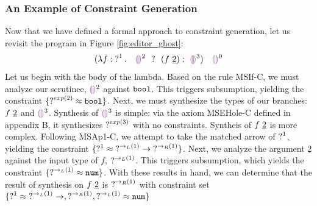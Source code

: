\subsubsection{An Example of Constraint Generation}
Now that we have defined a formal approach to constraint generation, let us revisit the program in Figure \ref{fig:editor_ghost}:
$$\ECAp{(\ECLam{f}{\TUnknown^1}{~~\ECIf{\EEHole^2~}{~(\ECAp{f}{\underline{2}})}{~\EEHole^3}})}{~~\EEHole^0}$$
Let us begin with the body of the lambda. Based on the rule MSIf-C, we must analyze our scrutinee, $\EEHole^2$ against $\mathtt{bool}$. This triggers subsumption, yielding the constraint $\{ \operatorname{?}^{exp(2)} \approx \mathtt{bool} \}$. Next, we must synthesize the types of our branches: $f ~\underline{2}$ and $\EEHole^3$. 
Synthesis of $\EEHole^3$ is simple: via the axiom MSEHole-C defined in appendix B, it synthesizes $\operatorname{?}^{exp(3)}$ with no constraints.
Syntheis of $f ~\underline{2}$ is more complex. Following MSAp1-C, we attempt to take the matched arrow of $\operatorname{?}^1$, yielding the constraint $\{ \operatorname{?}^1 \approx \operatorname{?}^{\rightarrow_L(1)} \rightarrow \operatorname{?}^{\rightarrow_R(1)} \}$. Next, we analyze the argument $\underline{2}$ against the input type of $f$, $\operatorname{?}^{\rightarrow_L(1)}$. This triggers subsumption, which yields the constraint $\{ \operatorname{?}^{\rightarrow_L(1)} \approx \mathtt{num} \}$. With these results in hand, we can determine that the result of synthesis on  $f ~\underline{2}$ is $\operatorname{?}^{\rightarrow_R(1)}$ with constraint set $\{ \operatorname{?}^1 \approx \operatorname{?}^{\rightarrow_L(1)} \rightarrow , \operatorname{?}^{\rightarrow_R(1)},  \operatorname{?}^{\rightarrow_L(1)} \approx \mathtt{num} \}$


